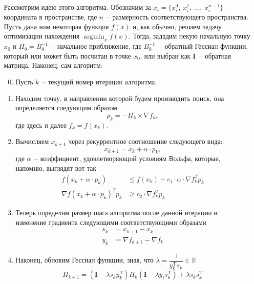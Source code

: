 \documentclass[12pt, a4paper, oneside, final]{article}
\begin{document}
	Рассмотрим идею этого алгоритма.
	Обозначим за $x_{i} = \{x_{i}^{0}, ~ x_{i}^{1}, ~ \ldots, ~ x_{i}^{n - 1}\}$~-- координата в пространстве, где $n$~-- размерность соответствующего пространства.
	Пусть дана нам некоторая функция $f(x)$ и, как обычно, решаем задачу оптимизации нахождения $\operatorname*{argmin}_{x}{f(x)}$.
	Тогда, зададим некую начальную точку $x_{0}$ и $H_{0} = B_{0}^{-1}$~-- начальное приближение, где $B_{0}^{-1}$~-- обратный Гессиан функции, который или может быть посчитан в точке $x_{0}$, или выбран как $\mathbf{I}$~-- обратная матрица.
	Наконец, сам алгоритм:
	\begin{enumerate}[1)]
		\setcounter{enumi}{-1}
		\item Пусть $k$~-- текущий номер итерации алгоритма.
		\item Находим точку, в направлении которой будем производить поиск, она определяется следующим образом
		\[
			p_{k} = -H_{k} \times \nabla{f_{k}},
		\] где здесь и далее $f_{k} = f(x_{k})$.
		\item Вычисляем $x_{k + 1}$ через рекуррентное соотношение следующего вида:
		\[
			x_{k + 1} = x_{k} + \alpha \cdot p_{k},
		\] где $\alpha$~-- коэффициент, удовлетворяющий условиям Вольфа, которые, напомню, выглядят вот так
		\begin{align*}
			f(x_{k} + \alpha \cdot p_{k}) &\leqslant f(x_{k}) + c_{1} \cdot \alpha \cdot \nabla{f^{T}_{k}p_{k}} \\
			\nabla{f(x_{k} + \alpha \cdot p_{k})^{T}p_{k}} &\geqslant c_{2} \cdot \nabla{f^{T}_{k}p_{k}}
		\end{align*}
		\item Теперь определим размер шага алгоритма после данной итерации и изменение градиента следующими соответствующими образами
		\begin{align*}
			s_{k} &= x_{k + 1} - x_{k} \\
			y_{k} &= \nabla{f_{k + 1}} - \nabla{f_{k}}
		\end{align*}
		\item Наконец, обновим Гессиан функции, зная, что $\lambda = \dfrac{1}{y_{k}^{\mathrm{T}}s_{k}} \in \mathbb{R}$
		\[
			H_{k + 1} = \left(\mathbf{I} - \lambda s_{k}y_{k}^{\mathrm{T}}\right)H_{k}\left(\mathbf{I} - \lambda y_{i} s_{k}^{\mathrm{T}}\right) + \lambda s_{k} s_{k}^{\mathrm{T}}
		\]
	\end{enumerate}
\end{document}
